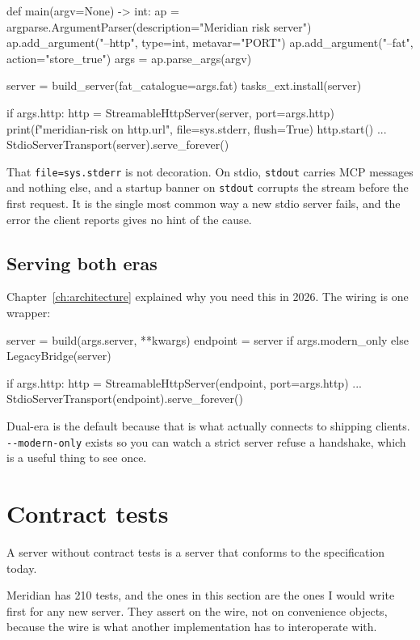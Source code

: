 \begin{py}
def main(argv=None) -> int:
    ap = argparse.ArgumentParser(description="Meridian risk server")
    ap.add_argument("--http", type=int, metavar="PORT")
    ap.add_argument("--fat", action="store_true")
    args = ap.parse_args(argv)

    server = build_server(fat_catalogue=args.fat)
    tasks_ext.install(server)

    if args.http:
        http = StreamableHttpServer(server, port=args.http)
        print(f"meridian-risk on {http.url}", file=sys.stderr, flush=True)
        http.start()
        ...
    StdioServerTransport(server).serve_forever()
\end{py}

That \texttt{file=sys.stderr} is not decoration. On stdio, \texttt{stdout} carries
MCP messages and nothing else, and a startup banner on \texttt{stdout} corrupts
the stream before the first request. It is the single most common way a new
stdio server fails, and the error the client reports gives no hint of the cause.

\subsection{Serving both eras}

Chapter~\ref{ch:architecture} explained why you need this in 2026. The wiring is
one wrapper:

\begin{py}
server = build(args.server, **kwargs)
endpoint = server if args.modern_only else LegacyBridge(server)

if args.http:
    http = StreamableHttpServer(endpoint, port=args.http)
    ...
StdioServerTransport(endpoint).serve_forever()
\end{py}

Dual-era is the default because that is what actually connects to shipping
clients. \texttt{-{}-modern-only} exists so you can watch a strict server refuse
a handshake, which is a useful thing to see once.

\section{Contract tests}

A server without contract tests is a server that conforms to the specification
today.

Meridian has 210 tests, and the ones in this section are the ones I would write
first for any new server. They assert on the wire, not on convenience objects,
because the wire is what another implementation has to interoperate with.

